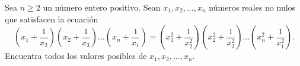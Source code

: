 \begin{problem}
    
    Sea $n\ge 2$ un número entero positivo. Sean $x_1, x_2, \dots, x_n$ números reales no nulos que satisfacen la ecuación
\[\left(x_1+\frac{1}{x_2}\right)\left(x_2+\frac{1}{x_3}\right)\dots\left(x_n+\frac{1}{x_1}\right)=\left(x_1^2+\frac{1}{x_2^2}\right)\left(x_2^2+\frac{1}{x_3^2}\right)\dots\left(x_n^2+\frac{1}{x_1^2}\right). \]
Encuentra todos los valores posibles de $x_1, x_2, \dots, x_n$.

    
    \label{20MEX6}
\end{problem}